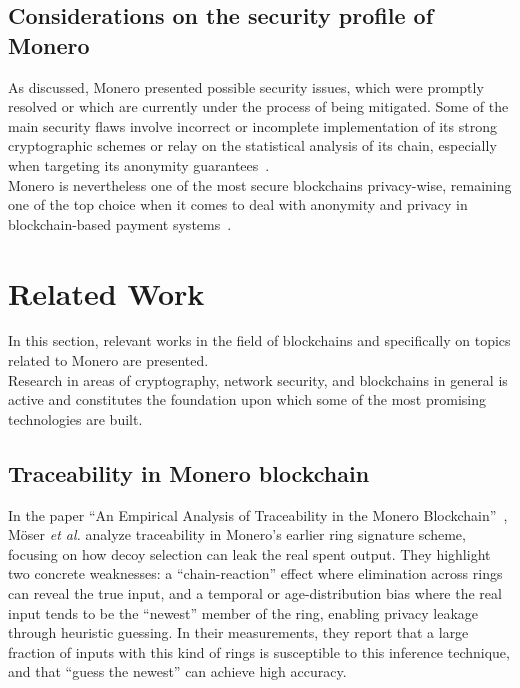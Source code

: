 \documentclass[conference]{IEEEtran}
\begin{document}
\subsection{Considerations on the security profile of Monero}
As discussed, Monero presented possible security issues, which were promptly resolved or which are currently under the process of being mitigated. Some of the main security flaws involve incorrect or incomplete implementation of its strong cryptographic schemes or relay on the statistical analysis of its chain, especially when targeting its anonymity guarantees~\cite{monero_security_analysis_mrl}.\\
Monero is nevertheless one of the most secure blockchains privacy-wise, remaining one of the top choice when it comes to deal with anonymity and privacy in blockchain-based payment systems~\cite{monero_privacy_guides}.



\section{Related Work}
In this section, relevant works in the field of blockchains and specifically on topics related to Monero are presented.\\
Research in areas of cryptography, network security, and blockchains in general is active and constitutes the foundation upon which some of the most promising technologies are built.

\subsection{Traceability in Monero blockchain}
In the paper ``An Empirical Analysis of Traceability in the Monero Blockchain''~\cite{traceability_monero_blockchain}, Möser \emph{et al.} analyze traceability in Monero’s earlier ring signature scheme, focusing on how decoy selection can leak the real spent output. They highlight two concrete weaknesses: a ``chain-reaction'' effect where elimination across rings can reveal the true input, and a temporal or age-distribution bias where the real input tends to be the ``newest'' member of the ring, enabling privacy leakage through heuristic guessing. In their measurements, they report that a large fraction of inputs with this kind of rings is susceptible to this inference technique, and that ``guess the newest'' can achieve high accuracy.\\
\end{document}
